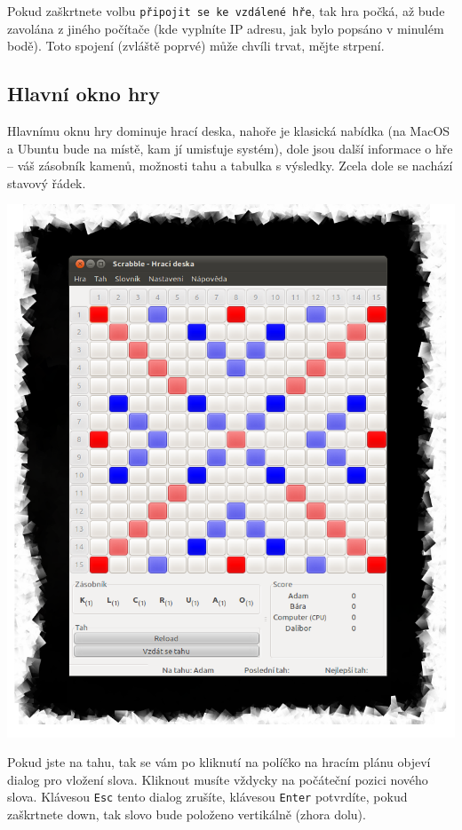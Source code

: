 \documentclass[a4paper]{article}
\begin{document}
Pokud zaškrtnete volbu \texttt{připojit se ke vzdálené hře}, tak hra počká, až bude zavolána z jiného počítače (kde vyplníte IP adresu, jak bylo popsáno v minulém bodě). Toto spojení (zvláště poprvé) může chvíli trvat, mějte strpení.

\subsection{Hlavní okno hry}
Hlavnímu oknu hry dominuje hrací deska, nahoře je klasická nabídka (na MacOS a Ubuntu bude na místě, kam jí umisťuje systém), dole jsou další informace o hře -- váš zásobník kamenů, možnosti tahu a tabulka s výsledky. Zcela dole se nachází stavový řádek.

\includegraphics[scale=1]{pic/mainWindow.png}

Pokud jste na tahu, tak se vám po kliknutí na políčko na hracím plánu objeví dialog pro vložení slova. Kliknout musíte vždycky na počáteční pozici nového slova. Klávesou \texttt{Esc} tento dialog zrušíte, klávesou \texttt{Enter} potvrdíte, pokud zaškrtnete down, tak slovo bude položeno vertikálně (zhora dolu).
\end{document}
